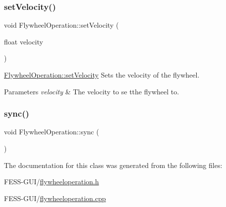\subsubsection{\texorpdfstring{set\+Velocity()}{setVelocity()}}
{\footnotesize\ttfamily void Flywheel\+Operation\+::set\+Velocity (\begin{DoxyParamCaption}\item[{float}]{velocity }\end{DoxyParamCaption})}



\hyperlink{class_flywheel_operation_a30e26868333a6a7d73ae34156ba432a8}{Flywheel\+Operation\+::set\+Velocity} Sets the velocity of the flywheel. 


\begin{DoxyParams}{Parameters}
{\em velocity} & The velocity to se tthe flywheel to. \\
\hline
\end{DoxyParams}
\hypertarget{class_flywheel_operation_a61df04a204188bd187ce68f9d610e78a}{}\label{class_flywheel_operation_a61df04a204188bd187ce68f9d610e78a} 
\subsubsection{\texorpdfstring{sync()}{sync()}}
{\footnotesize\ttfamily void Flywheel\+Operation\+::sync (\begin{DoxyParamCaption}{ }\end{DoxyParamCaption})}



The documentation for this class was generated from the following files\+:\begin{DoxyCompactItemize}
\item 
F\+E\+S\+S-\/\+G\+U\+I/\hyperlink{flywheeloperation_8h}{flywheeloperation.\+h}\item 
F\+E\+S\+S-\/\+G\+U\+I/\hyperlink{flywheeloperation_8cpp}{flywheeloperation.\+cpp}\end{DoxyCompactItemize}
